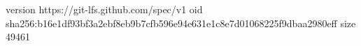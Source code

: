 version https://git-lfs.github.com/spec/v1
oid sha256:b16e1df93bf3a2ebf8eb9b7cfb596e94e631e1c8e7d01068225f9dbaa2980eff
size 49461
